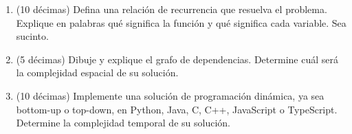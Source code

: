 
\begin{enumerate}
  \item (10 décimas) Defina una relación de recurrencia que resuelva el problema. Explique en palabras qué significa la función y qué significa cada variable. Sea sucinto.
  \item (5 décimas) Dibuje y explique el grafo de dependencias. Determine cuál será la complejidad espacial de su solución.
  \item (10 décimas) Implemente una solución de programación dinámica, ya sea bottom-up o top-down, en Python, Java, C, C++, JavaScript o TypeScript. Determine la complejidad temporal de su solución.
\end{enumerate}

\bigskip
